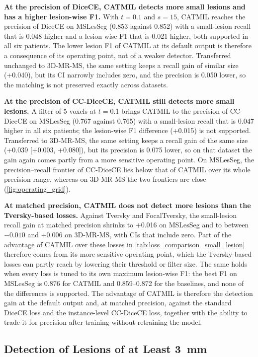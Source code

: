 \textbf{At the precision of DiceCE, CATMIL detects more small lesions and
has a higher lesion-wise F1.} With $t = 0.1$ and $s = 15$, CATMIL reaches
the precision of DiceCE on MSLesSeg (0.853 against 0.852) with a
small-lesion recall that is 0.048 higher and a lesion-wise F1 that is
0.021 higher, both supported in all six patients. The lower lesion F1 of
CATMIL at its default output is therefore a consequence of its operating
point, not of a weaker detector. Transferred unchanged to 3D-MR-MS, the
same setting keeps a recall gain of similar size (+0.040), but its CI
narrowly includes zero, and the precision is 0.050 lower, so the matching
is not preserved exactly across datasets.

\textbf{At the precision of CC-DiceCE, CATMIL still detects more small
lesions.} A filter of 5 voxels at $t = 0.1$ brings CATMIL to the precision
of CC-DiceCE on MSLesSeg (0.767 against 0.765) with a small-lesion recall
that is 0.047 higher in all six patients; the lesion-wise F1 difference
(+0.015) is not supported. Transferred to 3D-MR-MS, the same setting keeps
a recall gain of the same size (+0.039 [+0.003, +0.080]), but its precision
is 0.075 lower, so on that dataset the gain again comes partly from a more
sensitive operating point. On MSLesSeg, the precision--recall frontier of
CC-DiceCE lies below that of CATMIL over its whole precision range, whereas
on 3D-MR-MS the two frontiers are close (\cref{fig:operating_grid}).

\textbf{At matched precision, CATMIL does not detect more lesions than the
Tversky-based losses.} Against Tversky and FocalTversky, the small-lesion
recall gain at matched precision shrinks to +0.016 on MSLesSeg and to
between $-0.010$ and +0.006 on 3D-MR-MS, with CIs that include zero. Part
of the advantage of CATMIL over these losses in
\cref{tab:loss_comparison_small_lesion} therefore comes from its more
sensitive operating point, which the Tversky-based losses can partly reach
by lowering their threshold or filter size. The same holds when every loss
is tuned to its own maximum lesion-wise F1: the best F1 on MSLesSeg is
0.876 for CATMIL and 0.859--0.872 for the baselines, and none of the
differences is supported. The advantage of CATMIL is therefore the
detection gain at the default output and, at matched precision, against
the standard DiceCE loss and the instance-level CC-DiceCE loss, together
with the ability to trade it for precision after training without
retraining the model.

\subsection{Detection of Lesions of at Least 3~mm}
\label{sec:clinical_size}

